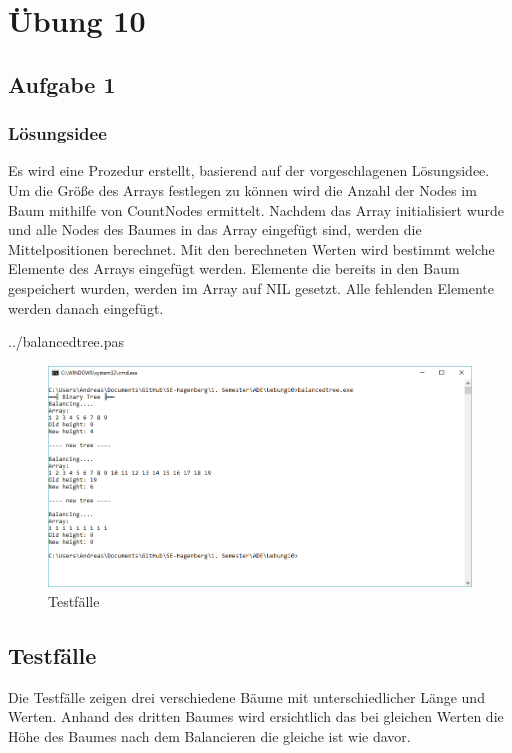 \section*{Übung 10}
\subsection*{Aufgabe 1}
\subsubsection*{Lösungsidee}
Es wird eine Prozedur erstellt, basierend auf der vorgeschlagenen Lösungsidee. Um die Größe des Arrays festlegen zu können wird die Anzahl der Nodes im Baum mithilfe von CountNodes ermittelt. Nachdem das Array initialisiert wurde und alle Nodes des Baumes in das Array eingefügt sind, werden die Mittelpositionen berechnet. Mit den berechneten Werten wird bestimmt welche Elemente des Arrays eingefügt werden. Elemente die bereits in den Baum gespeichert wurden, werden im Array auf NIL gesetzt. Alle fehlenden Elemente werden danach eingefügt.
\newline

 {../balancedtree.pas}
\begin{figure}[H]
	\centering
	\includegraphics[scale=0.65]{./pictures/balancedtree.png}
	\caption{Testfälle}
	\label{fig: BalancedTree}
\end{figure}

\subsection*{Testfälle}
Die Testfälle zeigen drei verschiedene Bäume mit unterschiedlicher Länge und Werten. Anhand des dritten Baumes wird ersichtlich das bei gleichen Werten die Höhe des Baumes nach dem Balancieren die gleiche ist wie davor.

